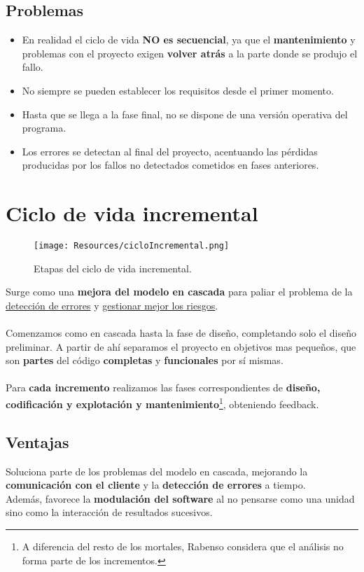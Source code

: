 \subsection{Problemas}
\begin{itemize}
   \item En realidad el ciclo de vida \textbf{NO es secuencial}, ya que el \textbf{mantenimiento} y problemas con el proyecto exigen \textbf{volver atrás} a la parte donde se produjo el fallo. %
   \item No siempre se pueden establecer los requisitos desde el primer momento.
   \item Hasta que se llega a la fase final, no se dispone de una versión operativa del programa.
   \item Los errores se detectan al final del proyecto, acentuando las pérdidas producidas por los fallos no detectados cometidos en fases anteriores.
\end{itemize}

\section{Ciclo de vida incremental} %
\begin{figure}[H]
   \centering
   \texttt{[image: Resources/cicloIncremental.png]}
   \caption{Etapas del ciclo de vida incremental.}
   \label{fig:procesoIncremental}
\end{figure}

Surge como una \textbf{mejora del modelo en cascada} para paliar el problema de la \uline{detección de errores} y \uline{gestionar mejor los riesgos}.\\\\
Comenzamos como en cascada hasta la fase de diseño, completando solo el diseño preliminar. A partir de ahí separamos el proyecto en objetivos mas pequeños, que son \textbf{partes} del código \textbf{completas} y \textbf{funcionales} por sí mismas.\\\\
Para \textbf{cada incremento} realizamos las fases correspondientes de \textbf{diseño, codificación y explotación y mantenimiento}\footnote{A diferencia del resto de los mortales, Rabenso considera que el análisis no forma parte de los incrementos.}, obteniendo feedback.

\subsection{Ventajas}
Soluciona parte de los problemas del modelo en cascada, mejorando la \textbf{comunicación con el cliente} y la \textbf{detección de errores} a tiempo.\\
Además, favorece la \textbf{modulación del software} al no pensarse como una unidad sino como la interacción de resultados sucesivos.\\

